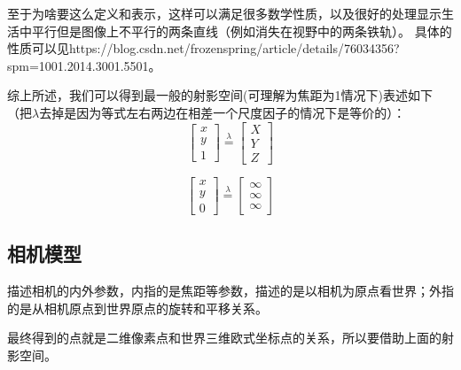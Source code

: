 \documentclass[12pt]{article}
\begin{document}
至于为啥要这么定义和表示，这样可以满足很多数学性质，以及很好的处理显示生活中平行但是图像上不平行的两条直线（例如消失在视野中的两条铁轨）。
具体的性质可以见https://blog.csdn.net/frozenspring/article/details/76034356?spm=1001.2014.3001.5501。

综上所述，我们可以得到最一般的射影空间(可理解为焦距为1情况下)表述如下（把$\lambda$去掉是因为等式左右两边在相差一个尺度因子的情况下是等价的）：
\begin{equation}
    \left[\begin{array}{l}
        x \\
        y \\
        1
        \end{array}\right]\overset{\lambda}{=}\left[\begin{array}{l}
        X \\
        Y \\
        Z
        \end{array}\right]
    \label{eq:sy1}
\end{equation}

\begin{equation}
    \left[\begin{array}{l}
        x \\
        y \\
        0
        \end{array}\right]\overset{\lambda}{=}\left[\begin{array}{l}
        \infty \\
        \infty \\
        \infty
        \end{array}\right]
    \label{eq:sy2}
\end{equation}

\newpage
\subsection{相机模型}
描述相机的内外参数，内指的是焦距等参数，描述的是以相机为原点看世界；外指的是从相机原点到世界原点的旋转和平移关系。

最终得到的点就是二维像素点和世界三维欧式坐标点的关系，所以要借助上面的射影空间。
\end{document}
